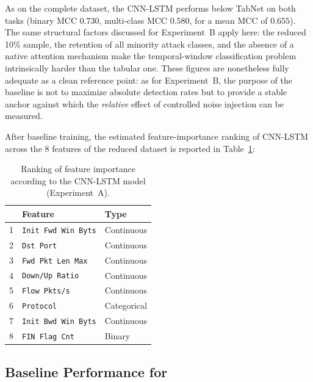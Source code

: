 \documentclass[../main.tex]{subfiles}
\begin{document}
As on the complete dataset, the CNN-LSTM performs below TabNet on both tasks (binary MCC $0.730$, multi-class MCC $0.580$, for a mean MCC of $0.655$). The same structural factors discussed for Experiment~B apply here: the reduced 10\% sample, the retention of all minority attack classes, and the absence of a native attention mechanism make the temporal-window classification problem intrinsically harder than the tabular one. These figures are nonetheless fully adequate as a clean reference point: as for Experiment~B, the purpose of the baseline is not to maximize absolute detection rates but to provide a stable anchor against which the \emph{relative} effect of controlled noise injection can be measured.

After baseline training, the estimated feature-importance ranking of CNN-LSTM across the 8 features of the reduced dataset is reported in Table~\ref{tab:final-ranking-features-CNN-LSTM-baseline-expA}:

\begin{table}[H]
    \centering
    \caption{Ranking of feature importance according to the CNN-LSTM model (Experiment~A).}
    \label{tab:final-ranking-features-CNN-LSTM-baseline-expA}
    \small
    \begin{tabular}{lll}
    \toprule
    \textbf{} & \textbf{Feature}            & \textbf{Type} \\
    \midrule
     1 &  \texttt{Init Fwd Win Byts}  & Continuous             \\
     2 &  \texttt{Dst Port}           & Continuous             \\
     3 &  \texttt{Fwd Pkt Len Max}    & Continuous             \\
     4 &  \texttt{Down/Up Ratio}      & Continuous             \\
     5 &  \texttt{Flow Pkts/s}        & Continuous             \\
     6 &  \texttt{Protocol}           & Categorical            \\
     7 &  \texttt{Init Bwd Win Byts}  & Continuous             \\
     8 &  \texttt{FIN Flag Cnt}       & Binary                 \\
    \bottomrule
    \end{tabular}
\end{table}




\newpage
\subsection{Baseline Performance for }
\label{sec:baseline-performance}
\end{document}
